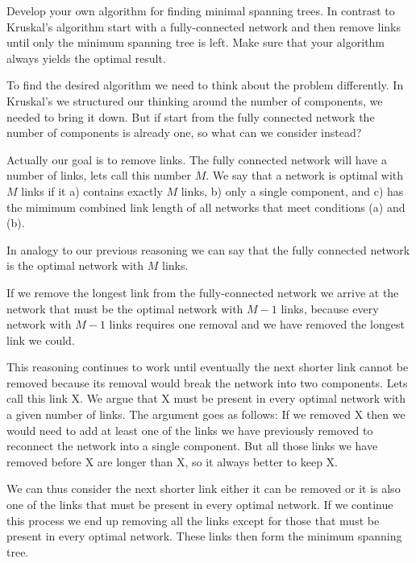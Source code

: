 



Develop your own algorithm for finding minimal spanning trees. In contrast to Kruskal's algorithm start with a fully-connected network and then remove links until only the minimum spanning tree is left. Make sure that your algorithm always yields the optimal result.


\solution
To find the desired algorithm we need to think about the problem differently. In Kruskal's we structured our thinking around the number of components, we needed to bring it down. But if start from the fully connected network the number of components is already one, so what can we consider instead? 

Actually our goal is to remove links. The fully connected network will have a number of links, lets call this number $M$. 
We say that a network is optimal with $M$ links if it a) contains exactly $M$ links, b) only a single component, and c) has the mimimum combined link length of all networks that meet conditions (a) and (b).

In analogy to our previous reasoning we can say that the fully connected network is the optimal network with $M$ links.

If we remove the longest link from the fully-connected network we arrive at the network that must be the optimal network with $M-1$ links, because every network with $M-1$ links requires one removal 
and we have removed the longest link we could. 

This reasoning continues to work until eventually the next shorter link cannot be removed because its removal would break the network into two components. Lets call this link X. We argue that X must be present in every optimal network with a given number of links. The argument goes as follows: If we removed X then we would need to add at least one of the links we have previously removed to reconnect the network into a single component. But all those links we have removed before X are longer than X, so it always better to keep X. 

We can thus consider the next shorter link either it can be removed or it is also one of the links that must be present in every optimal network. If we continue this process we end up removing all the links except for those that must be present in every optimal network. These links then form the minimum spanning tree. 

